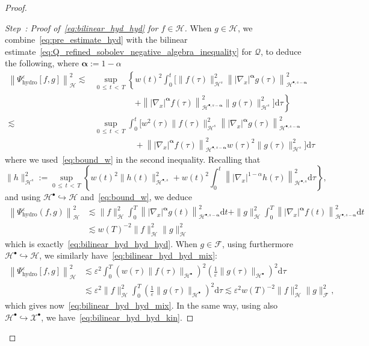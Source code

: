 \documentclass[AHL,Unicode,longabstracts,published]{cedram}
\newcommand{\hyd}{\mathrm{hydro}}
\renewcommand{\d}{\mathrm{d}}
\newcommand{\XX}{\mathcal{X}}
\newcommand{\HH}{\mathcal{H}}
\newcommand{\QQ}{\mathcal{Q}}
\newcommand{\FFF}{\mathscr{F}}
\newcommand{\HHH}{\mathscr{H}}
\newcommand{\SSs}{\HH}
\newcommand{\rSSs}[1]{\HH^{#1}}
\newcommand{\SSsp}{\HH^{\bullet}}
\newcommand{\rSSsp}[1]{\HH^{{\bullet}, #1}}
\newcommand{\SSSs}{\HHH}
\newcommand{\rSSSs}[1]{\HHH^{#1}}
\newcommand{\SSlp}{\XX^{\bullet}}
\newcommand{\SSSm}{\FFF}
\renewcommand*\le{\leqslant}
\newcommand*\eps{{\varepsilon}}
\newcounter{stepcount}
\newenvironment{step}[1]{\refstepcounter{stepcount}\begin{proof}[Step~\thestepcount: #1]}{\let\qed\relax\end{proof}}
\begin{document}
\begin{proof}
\setcounter{stepcount}{0}
\begin{step}{{Proof of~\eqref{eq:bilinear_hyd_hyd} for $f \in \SSSs$}}\label{prfprop5.3stp1}
When $g \in \SSSs$, we combine~\eqref{eq:pre_estimate_hyd} with the bilinear estimate~\eqref{eq:Q_refined_sobolev_negative_algebra_inequality} for $\QQ$, to deduce the following, where $\boldsymbol{\alpha} := 1 - \alpha$
\begin{align*}
\left\| \Psi^\eps_\hyd [f, g] \right\|_\SSSs^2
\lesssim & \sup_{0\,\le\,t\,<\,T}\left\{w(t)^2\int_0^t \Big[\|f(\tau) \|_{ \rSSs{s} }^2 \left\| |\nabla_x|^{\boldsymbol{\alpha}} g(\tau) \right\|_{\rSSsp{s-{\boldsymbol{\alpha}}}}^2 \right.\\
& \phantom{+++++} \left.+ \left\| |\nabla_x|^{\boldsymbol{\alpha}} f(\tau) \right\|_{\rSSsp{s-{\boldsymbol{\alpha}}}}^2 \| g(\tau) \|_{ \rSSs{s} }^2 \Big] \d \tau\right\}\\
\lesssim & \sup_{0\,\le\,t\,<\,T}\int_0^t \Big[w^2(\tau)\|f(\tau) \|_{ \rSSs{s} }^2 \left\| |\nabla_x|^{\boldsymbol{\alpha}} g(\tau) \right\|_{\rSSsp{s-{\boldsymbol{\alpha}}}}^2 \\
&\phantom{+++++} +\left\| |\nabla_x|^{\boldsymbol{\alpha}} f(\tau) \right\|_{\rSSsp{s-{\boldsymbol{\alpha}}}}^2 w(\tau)^2\| g(\tau) \|_{ \rSSs{s} }^2 \Big] \d \tau
\end{align*}
where we used~\eqref{eq:bound_w} in the second inequality. Recalling that
\[
\| h \|_{\rSSSs{s}}^2 := \sup_{0\,\le\,t\,<\,T} \left\{ w(t)^2 \| h(t) \|_{\rSSsp{s}}^2 + w(t)^2 \int_0^t \left\| |\nabla_x|^{1-\alpha} h(\tau) \right\|_{\rSSsp{s}}^2 \d \tau \right\},
\]
and using $\SSsp \hookrightarrow \SSs$ and~\eqref{eq:bound_w}, we deduce
\begin{align*}
\left\| \Psi^\eps_\hyd(f,g) \right\|_\SSSs^2 &\lesssim
\| f \|_{ \SSSs }^2 \int_0^T \left\| |\nabla_x|^{\boldsymbol{\alpha}} g(t) \right\|_{\rSSsp{s-{\boldsymbol{\alpha}}}}^2 \d t + \| g \|_{ \SSSs }^2 \int_0^T \left\| |\nabla_x|^{\boldsymbol{\alpha}} f(t) \right\|_{\rSSsp{s-{\boldsymbol{\alpha}}}}^2 \d t\\
& \lesssim w(T)^{-2} \| f \|_\SSSs^2 \| g \|_\SSSs^2
\end{align*}
which is exactly~\eqref{eq:bilinear_hyd_hyd_hyd}. When $g \in \SSSm$, using furthermore $\SSsp \hookrightarrow \SSs$, we similarly have~\eqref{eq:bilinear_hyd_hyd_mix}:
\begin{align*}
\left\| \Psi^\eps_\hyd [f, g] \right\|_\SSSs^2 &\lesssim \eps^2 \int_0^T \left(w(\tau)\|f(\tau) \|_{ \SSsp } \right)^2 \left(\frac{1}{\eps} \| g(\tau) \|_{\SSsp}\right)^2 \d \tau \\
&\lesssim \eps^2 \| f \|_\SSSs^2 \int_0^T \left(\frac{1}{\eps} \| g(\tau) \|_{\SSsp}\right)^2 \d \tau\lesssim \eps^2 w(T)^{-2} \| f \|_\SSSs^2 \| g \|_\SSSm^2,
\end{align*}
which gives now~\eqref{eq:bilinear_hyd_hyd_mix}. In the same way, using also $\SSsp \hookrightarrow \SSlp$, we have~\eqref{eq:bilinear_hyd_hyd_kin}.
\end{step}


\end{proof}
\end{document}
